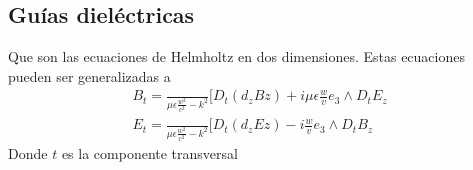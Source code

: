 \subsection{Guías dieléctricas}
Que son las ecuaciones de Helmholtz en dos dimensiones. Estas ecuaciones pueden ser generalizadas a
\begin{subequations}
	\begin{align}
	B_{t}=\frac{}{\mu \epsilon\frac{w^2}{c^2}-k^2}[D_{t} (d_{z} B{z})+i\mu\epsilon\frac{w}{v}e_{3}\wedge D_{t}E_{z} \\
	E_{t}=\frac{}{\mu \epsilon\frac{w^2}{c^2}-k^2}[D_{t} (d_{z} E{z})-i\frac{w}{v}e_{3}\wedge D_{t}B_{z} 
	\end{align}
	\end{subequations}
Donde $t$ es la componente transversal